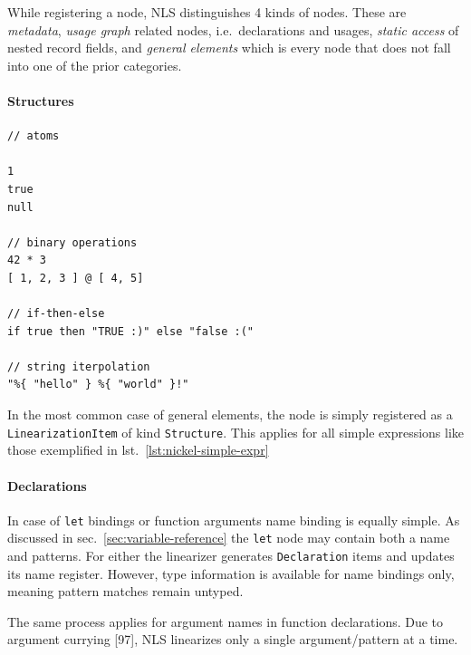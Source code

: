 \documentclass[
  a4paper,
  bibtex,
  english,
  nomenclature]{kthlatex/kththesis/kththesis}
\begin{document}
While registering a node, NLS distinguishes 4 kinds of nodes. These are
\emph{metadata}, \emph{usage graph} related nodes, i.e.~declarations and
usages, \emph{static access} of nested record fields, and \emph{general
elements} which is every node that does not fall into one of the prior
categories.

\hypertarget{sec:structures}{%
\paragraph{Structures}\label{sec:structures}}

\begin{codelisting}

\caption{Exemplary nickel expressions}

\hypertarget{lst:nickel-simple-expr}{%
\label{lst:nickel-simple-expr}}%
\begin{verbatim}
// atoms

1
true
null

// binary operations
42 * 3
[ 1, 2, 3 ] @ [ 4, 5]

// if-then-else
if true then "TRUE :)" else "false :("

// string iterpolation
"%{ "hello" } %{ "world" }!"
\end{verbatim}

\end{codelisting}

In the most common case of general elements, the node is simply
registered as a \texttt{LinearizationItem} of kind \texttt{Structure}.
This applies for all simple expressions like those exemplified in
lst.~\ref{lst:nickel-simple-expr}

\hypertarget{sec:declarations}{%
\paragraph{Declarations}\label{sec:declarations}}

In case of \texttt{let} bindings or function arguments name binding is
equally simple. As discussed in sec.~\ref{sec:variable-reference} the
\texttt{let} node may contain both a name and patterns. For either the
linearizer generates \texttt{Declaration} items and updates its name
register. However, type information is available for name bindings only,
meaning pattern matches remain untyped.

The same process applies for argument names in function declarations.
Due to argument currying {[}97{]}, NLS linearizes only a single
argument/pattern at a time.
\end{document}
